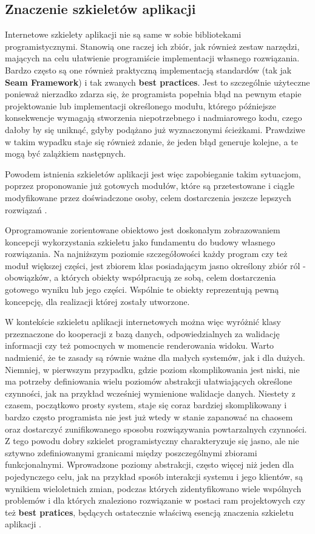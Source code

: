 \subsection{Znaczenie szkieletów aplikacji}
	Internetowe szkielety aplikacji nie są same w sobie bibliotekami programistycznymi. Stanowią one raczej ich zbiór, jak również zestaw narzędzi, mających na celu ułatwienie programiście implementacji własnego rozwiązania. Bardzo często są one również praktyczną implementacją standardów (tak jak \textbf{Seam Framework}) i tak zwanych \textbf{best practices}. Jest to szczególnie użyteczne ponieważ nierzadko zdarza się, że programista popełnia błąd na pewnym etapie projektowanie lub implementacji określonego modułu, którego późniejsze konsekwencje wymagają stworzenia niepotrzebnego i nadmiarowego kodu, czego dałoby by się uniknąć, gdyby podążano już wyznaczonymi ścieżkami. Prawdziwe w takim wypadku staje się również zdanie, że jeden błąd generuje kolejne, a te mogą być zalążkiem następnych.
	
	Powodem istnienia szkieletów aplikacji jest więc zapobieganie takim sytuacjom, poprzez proponowanie już gotowych modułów, które są przetestowane i ciągle modyfikowane przez doświadczone osoby, celem dostarczenia jeszcze lepszych rozwiązań \cite{art_of_java_web_dev}.
	
	Oprogramowanie zorientowane obiektowo jest doskonałym zobrazowaniem koncepcji wykorzystania szkieletu jako fundamentu do budowy własnego rozwiązania. Na najniższym poziomie szczegółowości każdy program czy też moduł większej części, jest zbiorem klas posiadającym jasno określony zbiór ról - obowiązków, a których obiekty współpracują ze sobą, celem dostarczenia gotowego wyniku lub jego części. Wspólnie te obiekty reprezentują pewną koncepcję, dla realizacji której zostały utworzone. 
	
	W kontekście szkieletu aplikacji internetowych można więc wyróżnić klasy przeznaczone do kooperacji z bazą danych, odpowiedzialnych za walidację informacji czy też pomocnych w momencie renderowania widoku. Warto nadmienić, że te zasady są równie ważne dla małych systemów, jak i dla dużych. Niemniej, w pierwszym przypadku, gdzie poziom skomplikowania jest niski, nie ma potrzeby definiowania wielu poziomów abstrakcji ułatwiających określone czynności, jak na przykład wcześniej wymienione walidacje danych. Niestety z czasem, początkowo prosty system, staje się coraz bardziej skomplikowany i bardzo często programista nie jest już wtedy w stanie zapanować na chaosem oraz dostarczyć zunifikowanego sposobu rozwiązywania powtarzalnych czynności. Z tego powodu dobry szkielet programistyczny charakteryzuje się jasno, ale nie sztywno zdefiniowanymi granicami między poszczególnymi zbiorami funkcjonalnymi. Wprowadzone poziomy abstrakcji, często więcej niż jeden dla pojedynczego celu, jak na przykład sposób interakcji systemu i jego klientów, są wynikiem wieloletnich zmian, podczas których zidentyfikowano wiele wspólnych problemów i dla których znaleziono rozwiązanie w postaci ram projektowych czy też \textbf{best pratices}, będących ostatecznie właściwą esencją znaczenia szkieletu aplikacji \cite{framework_design_-_a_role_modeling_approach}.
	
